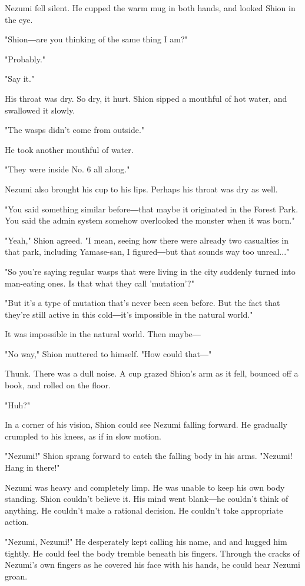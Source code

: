 Nezumi fell silent. He cupped the warm mug in both hands, and looked
Shion in the eye.

"Shion―are you thinking of the same thing I am?"

"Probably."

"Say it."

His throat was dry. So dry, it hurt. Shion sipped a mouthful of hot
water, and swallowed it slowly.

"The wasps didn't come from outside."

He took another mouthful of water.

"They were inside No. 6 all along."

Nezumi also brought his cup to his lips. Perhaps his throat was dry as
well.

"You said something similar before―that maybe it originated in the
Forest Park. You said the admin system somehow overlooked the monster
when it was born."

"Yeah," Shion agreed. "I mean, seeing how there were already two
casualties in that park, including Yamase-san, I figured―but that sounds
way too unreal..."

"So you're saying regular wasps that were living in the city suddenly
turned into man-eating ones. Is that what they call 'mutation'?"

"But it's a type of mutation that's never been seen before. But the fact
that they're still active in this cold―it's impossible in the natural
world."

It was impossible in the natural world. Then maybe―

"No way," Shion muttered to himself. "How could that―"

Thunk. There was a dull noise. A cup grazed Shion's arm as it fell,
bounced off a book, and rolled on the floor.

"Huh?"

In a corner of his vision, Shion could see Nezumi falling forward. He
gradually crumpled to his knees, as if in slow motion.

"Nezumi!" Shion sprang forward to catch the falling body in his arms.
"Nezumi! Hang in there!"

Nezumi was heavy and completely limp. He was unable to keep his own body
standing. Shion couldn't believe it. His mind went blank―he couldn't
think of anything. He couldn't make a rational decision. He couldn't
take appropriate action.

"Nezumi, Nezumi!" He desperately kept calling his name, and and hugged
him tightly. He could feel the body tremble beneath his fingers. Through
the cracks of Nezumi's own fingers as he covered his face with his
hands, he could hear Nezumi groan.

